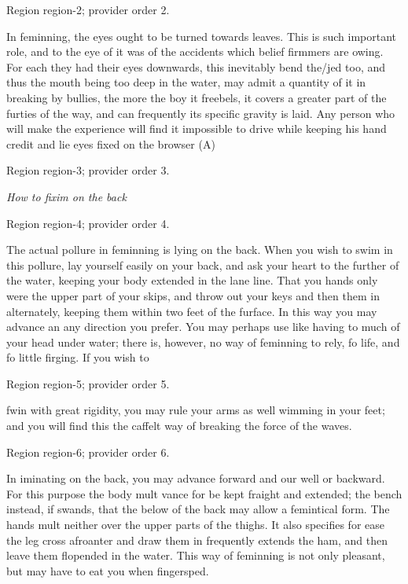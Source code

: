 \documentclass[11pt]{article}
\begin{document}
{\scriptsize\color{gray} Region region-2; provider order 2.\par}
\medskip

In feminning, the eyes ought to be turned towards leaves. This is such important role, and to the eye of it was of the accidents which belief firmmers are owing. For each they had their eyes downwards, this inevitably bend the/jed too, and thus the mouth being too deep in the water, may admit a quantity of it in breaking by bullies, the more the boy it freebels, it covers a greater part of the furties of the way, and can frequently its specific gravity is laid. Any person who will make the experience will find it impossible to drive while keeping his hand credit and lie eyes fixed on the browser (A)
\par

{\scriptsize\color{gray} Region region-3; provider order 3.\par}
\medskip

{\small\itshape How to fixim on the back\par}

{\scriptsize\color{gray} Region region-4; provider order 4.\par}
\medskip

The actual pollure in feminning is lying on the back. When you wish to swim in this pollure, lay yourself easily on your back, and ask your heart to the further of the water, keeping your body extended in the lane line. That you hands only were the upper part of your skips, and throw out your keys and then them in alternately, keeping them within two feet of the furface. In this way you may advance an any direction you prefer. You may perhaps use like having to much of your head under water; there is, however, no way of feminning to rely, fo life, and fo little firging. If you wish to
\par

{\scriptsize\color{gray} Region region-5; provider order 5.\par}
\medskip

fwin with great rigidity, you may rule your arms as well wimming in your feet; and you will find this the caffelt way of breaking the force of the waves.
\par

{\scriptsize\color{gray} Region region-6; provider order 6.\par}
\medskip

In iminating on the back, you may advance forward and our well or backward. For this purpose the body mult vance for be kept fraight and extended; the bench instead, if swands, that the below of the back may allow a femintical form. The hands mult neither over the upper parts of the thighs. It also specifies for ease the leg cross afroanter and draw them in frequently extends the ham, and then leave them flopended in the water. This way of feminning is not only pleasant, but may have to eat you when fingersped.
\par
\end{document}
